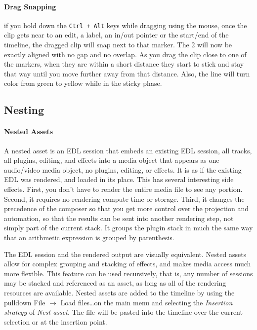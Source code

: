 \paragraph{Drag Snapping} if you hold down the \texttt{Ctrl + Alt} keys while dragging using the mouse, once the clip gets near to an edit, a label, an in/out pointer or the start/end of the timeline, the dragged clip will snap next to that marker.  The 2 will now be exactly aligned with no gap and no overlap.  As you drag the clip close to one of the markers, when they are within a short distance they start to stick and stay that way until you move further away from that distance.  Also, the line will turn color from green to yellow while in the sticky phase.

\subsection{Nesting}%
\label{sub:nesting}

\paragraph{Nested Assets} A nested asset is an EDL session that embeds an existing EDL session, all tracks, all plugins, editing, and effects into a media object that appears as one audio/video media object, no plugins, editing, or effects.  It is as if the existing EDL was rendered, and loaded in its place.  This has several interesting side effects.  First, you don’t have to render the entire media file to see any portion.  Second, it requires no rendering compute time or storage.  Third, it changes the precedence of the composer so that you get more control over the projection and automation, so that the results can be sent into another rendering step, not simply part of the current stack.  It groups the plugin stack in much the same way that an arithmetic expression is grouped by parenthesis.

The EDL session and the rendered output are visually equivalent.  Nested assets allow for complex grouping and stacking of effects, and makes media access much more flexible.  This feature can be used recursively, that is, any number of sessions may be stacked and referenced as an asset, as long as all of the rendering resources are available.  Nested assets are added to the timeline by using the pulldown File $\rightarrow$ Load files\dots on the main menu and selecting the \textit{Insertion strategy} of \textit{Nest asset}. The file will be pasted into the timeline over the current selection or at the insertion point.

